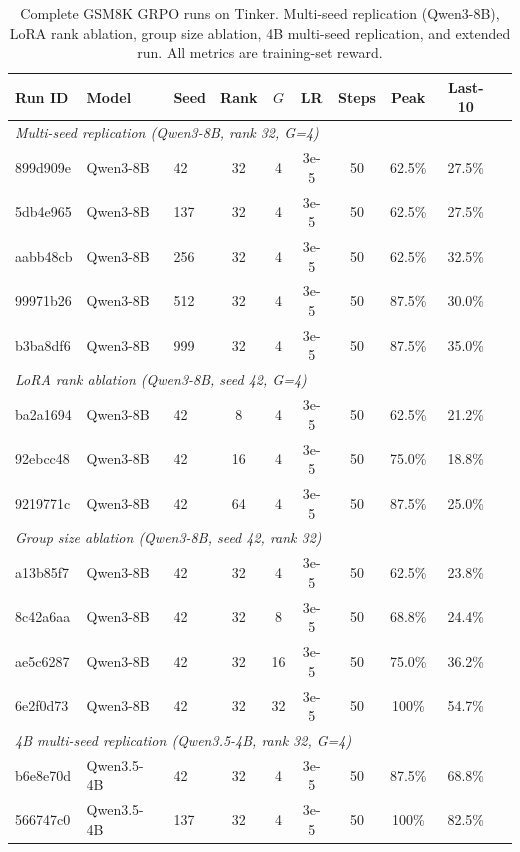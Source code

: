 \documentclass{article}
\begin{document}
\begin{table}[htbp]
    \centering
    \caption{Complete GSM8K GRPO runs on Tinker. Multi-seed replication (Qwen3-8B), LoRA rank ablation, group size ablation, 4B multi-seed replication, and extended run. All metrics are training-set reward.}
    \begin{tabular}{lllccccccc}
        \toprule
        Run ID & Model & Seed & Rank & $G$ & LR & Steps & Peak & Last-10 \\
        \midrule
        \multicolumn{9}{l}{\emph{Multi-seed replication (Qwen3-8B, rank 32, G=4)}} \\
        899d909e & Qwen3-8B & 42 & 32 & 4 & 3e-5 & 50 & 62.5\% & 27.5\% \\
        5db4e965 & Qwen3-8B & 137 & 32 & 4 & 3e-5 & 50 & 62.5\% & 27.5\% \\
        aabb48cb & Qwen3-8B & 256 & 32 & 4 & 3e-5 & 50 & 62.5\% & 32.5\% \\
        99971b26 & Qwen3-8B & 512 & 32 & 4 & 3e-5 & 50 & 87.5\% & 30.0\% \\
        b3ba8df6 & Qwen3-8B & 999 & 32 & 4 & 3e-5 & 50 & 87.5\% & 35.0\% \\
        \midrule
        \multicolumn{9}{l}{\emph{LoRA rank ablation (Qwen3-8B, seed 42, G=4)}} \\
        ba2a1694 & Qwen3-8B & 42 & 8 & 4 & 3e-5 & 50 & 62.5\% & 21.2\% \\
        92ebcc48 & Qwen3-8B & 42 & 16 & 4 & 3e-5 & 50 & 75.0\% & 18.8\% \\
        9219771c & Qwen3-8B & 42 & 64 & 4 & 3e-5 & 50 & 87.5\% & 25.0\% \\
        \midrule
        \multicolumn{9}{l}{\emph{Group size ablation (Qwen3-8B, seed 42, rank 32)}} \\
        a13b85f7 & Qwen3-8B & 42 & 32 & 4 & 3e-5 & 50 & 62.5\% & 23.8\% \\
        8c42a6aa & Qwen3-8B & 42 & 32 & 8 & 3e-5 & 50 & 68.8\% & 24.4\% \\
        ae5c6287 & Qwen3-8B & 42 & 32 & 16 & 3e-5 & 50 & 75.0\% & 36.2\% \\
        6e2f0d73 & Qwen3-8B & 42 & 32 & 32 & 3e-5 & 50 & 100\% & 54.7\% \\
        \midrule
        \multicolumn{9}{l}{\emph{4B multi-seed replication (Qwen3.5-4B, rank 32, G=4)}} \\
        b6e8e70d & Qwen3.5-4B & 42 & 32 & 4 & 3e-5 & 50 & 87.5\% & 68.8\% \\
        566747c0 & Qwen3.5-4B & 137 & 32 & 4 & 3e-5 & 50 & 100\% & 82.5\% \\

\end{tabular}
\end{table}
\end{document}
